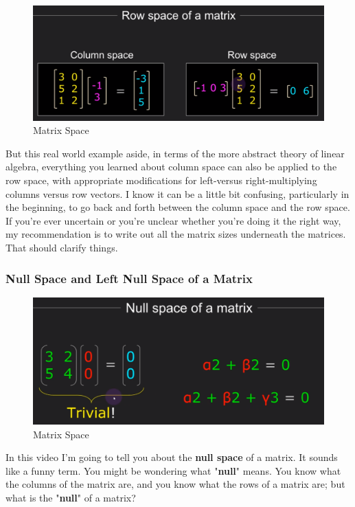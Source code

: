 \documentclass[fleqn,10pt]{olplainarticle}
\theoremstyle{definition}
\theoremstyle{remark}
\begin{document}
\begin{figure}[ht]
	\centering
	\includegraphics[width=0.9\linewidth]{images/matrix-space-16.png}
	\caption{Matrix Space}
	\label{fig:matrix_space_16}
\end{figure}

But this real world example aside, in terms of the more abstract theory of linear algebra, everything you learned about column space can also be applied to the row space, with appropriate modifications for left-versus right-multiplying columns versus row vectors. I know it can be a little bit confusing, particularly in the beginning, to go back and forth between the column space and the row space. If you're ever uncertain or you're unclear whether you're doing it the right way, my recommendation is to write out all the matrix sizes underneath the matrices. That should clarify things.

\pagebreak

\subsubsection*{Null Space and Left Null Space of a Matrix}

\begin{figure}[ht]
	\centering
	\includegraphics[width=0.5\linewidth]{images/matrix-space-17.png}
	\caption{Matrix Space}
	\label{fig:matrix_space_17}
\end{figure}

In this video I'm going to tell you about the \textbf{null space} of a matrix. It sounds like a funny term. You might be wondering what "\textbf{null}" means. You know what the columns of the matrix are, and you know what the rows of a matrix are; but what is the "\textbf{null}" of a matrix?
\end{document}
